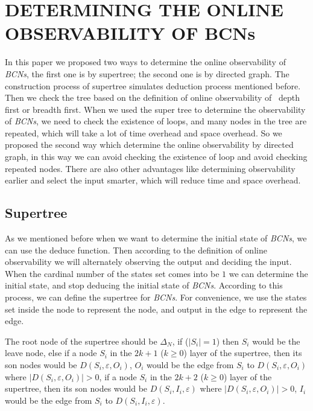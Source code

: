 \section{DETERMINING THE ONLINE OBSERVABILITY OF BCNs}

In this paper we proposed two ways to determine the online observability of {\em BCNs}, the first one is by supertree; the second one is by directed graph. The construction process of supertree simulates deduction process mentioned before. Then we check the tree based on the definition of online observability of \BCNs\ depth first or breadth first. When we used the super tree to determine the observability of {\em BCNs}, we need to check the existence of loops, and many nodes in the tree are repeated, which will take a lot of time overhead and space overhead. So we proposed the second way which determine the online observability by directed graph,   in this way we can avoid checking the existence of loop and avoid checking repeated nodes. There are also other advantages like determining observability earlier and select the input smarter, which will reduce time and space overhead.    

\subsection{Supertree} As we mentioned before when we want to determine the initial state of {\em BCNs}, we can use the deduce function. Then according to the definition of online observability we will alternately observing the output and deciding the input. When the  cardinal number of the states set comes into be $1$ we can determine the initial state, and stop deducing the initial state of {\em BCNs}. According to this process, we can define the supertree for {\em BCNs}. For convenience, we use the states set inside the node to represent the node, and output in the edge to represent the edge.
\begin{definition}[Supertree]
The root node of the supertree should be $\Delta_N$, if ($|S_i|=1$) then $S_i$ would be the leave node, else if a node $S_i$ in the $2k + 1$ ($k\ge 0$) layer of the supertree, then its son nodes would be $D\left(S_i,\varepsilon, O_i\right)$, $O_i$ would be the edge from $S_i$ to $D\left(S_i,\varepsilon, O_i\right)$ where $|D\left(S_i,\varepsilon, O_i\right)|>0$, if a node $S_i$ in the $2k + 2$ ($k\ge 0$) layer of the supertree, then its son nodes would be $D\left(S_i,I_i,\varepsilon\right)$ where $|D\left(S_i,\varepsilon, O_i\right)|>0$, $I_i$ would be the edge from $S_i$ to $D\left(S_i,I_i,\varepsilon\right)$. 
\end{definition}

